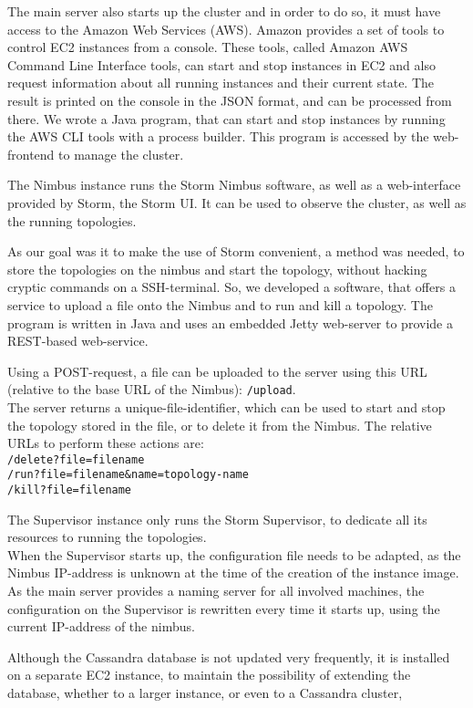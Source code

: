 \begin{description}
The main server also starts up the cluster and in order to do so, it must have access to the Amazon Web Services (AWS). Amazon provides a set of tools to control EC2 instances from a console. These tools, called Amazon AWS Command Line Interface tools, can start and stop instances in EC2 and also request information about all running instances and their current state. The result is printed on the console in the JSON format, and can be processed from there. We wrote a Java program, that can start and stop instances by running the AWS CLI tools with a process builder. This program is accessed by the web-frontend to manage the cluster.

The Nimbus instance runs the Storm Nimbus software, as well as a web-interface provided by Storm, the Storm UI. It can be used to observe the cluster, as well as the running topologies.

As our goal was it to make the use of Storm convenient, a method was needed, to store the topologies on the nimbus and start the topology, without hacking cryptic commands on a SSH-terminal. So, we developed a software, that offers a service to upload a file onto the Nimbus and to run and kill a topology. The program is written in Java and uses an embedded Jetty web-server to provide a REST-based web-service.

Using a POST-request, a file can be uploaded to the server using this URL (relative to the base URL of the Nimbus): \texttt{/upload}.\\
The server returns a unique-file-identifier, which can be used to start and stop the topology stored in the file, or to delete it from the Nimbus. The relative URLs to perform these actions are:\\
\texttt{/delete?file=filename}\\
\texttt{/run?file=filename\&name=topology-name}\\
\texttt{/kill?file=filename}

The Supervisor instance only runs the Storm Supervisor, to dedicate all its resources to running the topologies.\\
When the Supervisor starts up, the configuration file needs to be adapted, as the Nimbus IP-address is unknown at the time of the creation of the instance image. As the main server provides a naming server for all involved machines, the configuration on the Supervisor is rewritten every time it starts up, using the current IP-address of the nimbus.

Although the Cassandra database is not updated very frequently, it is installed on a separate EC2 instance, to maintain the possibility of extending the database, whether to a larger instance, or even to a Cassandra cluster,

\end{description}